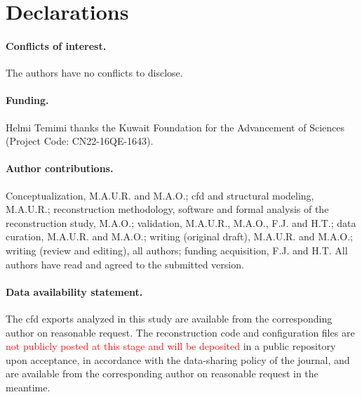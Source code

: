 \documentclass[12pt,a4paper]{article}
\newcommand{\CFD}{\ac{cfd}\xspace}
\theoremstyle{definition}
\numberwithin{equation}{section}
\newif\ifanonymized
\newcommand{\revision}[1]{\textcolor{red}{#1}}
\begin{document}
\section*{Declarations}
\paragraph{Conflicts of interest.} The authors have no conflicts to disclose.

\ifanonymized
\paragraph{Funding and author contributions.} Removed for anonymized review.
\else
\paragraph{Funding.} Helmi Temimi thanks the Kuwait Foundation for the Advancement of Sciences (Project Code: CN22-16QE-1643).

\paragraph{Author contributions.} Conceptualization, M.A.U.R. and M.A.O.; \CFD and structural modeling, M.A.U.R.; reconstruction methodology, software and formal analysis of the reconstruction study, M.A.O.; validation, M.A.U.R., M.A.O., F.J. and H.T.; data curation, M.A.U.R. and M.A.O.; writing (original draft), M.A.U.R. and M.A.O.; writing (review and editing), all authors; funding acquisition, F.J. and H.T. All authors have read and agreed to the submitted version.
\fi


\paragraph{Data availability statement.} The \CFD exports analyzed in this study are available from the corresponding author on reasonable request. The reconstruction code and configuration files are \revision{not publicly posted at this stage and will be deposited} in a public repository upon acceptance, in accordance with the data-sharing policy of the journal, and are available from the corresponding author on reasonable request in the meantime.
\appendix
\end{document}

